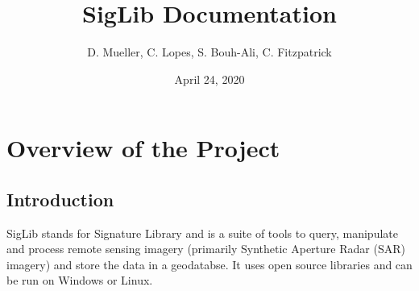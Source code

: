 \documentclass[letterpaper,10pt,openany,oneside]{sphinxmanual}
\title{SigLib Documentation}
\date{April 24, 2020}
\author{D. Mueller, C. Lopes, S. Bouh-Ali, C. Fitzpatrick}
\begin{document}
\maketitle
\tableofcontents
{}\label{index::doc}



\chapter{Overview of the Project}
\label{intro:overview-of-the-project}\label{intro:welcome-to-siglib-s-documentation}\label{intro::doc}

\section{Introduction}
\label{intro:introduction}
SigLib stands for Signature Library and is a suite of tools to query,
manipulate and process remote sensing imagery (primarily Synthetic
Aperture Radar (SAR) imagery) and store the data in a geodatabse. It
uses open source libraries and can be run on Windows or Linux.
\end{document}
